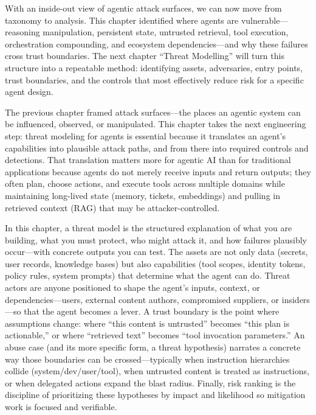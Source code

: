 \begin{TNtwocol}
  \medskip

  With an inside-out view of agentic attack surfaces, we can now move from taxonomy to analysis. This chapter identified where agents are vulnerable—reasoning manipulation, persistent state, untrusted retrieval, tool execution, orchestration compounding, and ecosystem dependencies—and why these failures cross trust boundaries. The next chapter ``Threat Modelling'' will turn this structure into a repeatable method: identifying assets, adversaries, entry points, trust boundaries, and the controls that most effectively reduce risk for a specific agent design.

\end{TNtwocol}


\begin{TNtwocol}

  The previous chapter framed attack surfaces—the places an agentic system can be influenced, observed, or manipulated. This chapter takes the next engineering step: threat modeling for agents is essential because it translates an agent's capabilities into plausible attack paths, and from there into required controls and detections. That translation matters more for agentic AI than for traditional applications because agents do not merely receive inputs and return outputs; they often plan, choose actions, and execute tools across multiple domains while maintaining long-lived state (memory, tickets, embeddings) and pulling in retrieved context (RAG) that may be attacker-controlled.

  In this chapter, a threat model is the structured explanation of what you are building, what you must protect, who might attack it, and how failures plausibly occur—with concrete outputs you can test. The assets are not only data (secrets, user records, knowledge bases) but also capabilities (tool scopes, identity tokens, policy rules, system prompts) that determine what the agent can do. Threat actors are anyone positioned to shape the agent's inputs, context, or dependencies—users, external content authors, compromised suppliers, or insiders—so that the agent becomes a lever. A trust boundary is the point where assumptions change: where “this content is untrusted” becomes “this plan is actionable,” or where “retrieved text” becomes “tool invocation parameters.” An abuse case (and its more specific form, a threat hypothesis) narrates a concrete way those boundaries can be crossed—typically when instruction hierarchies collide (system/dev/user/tool), when untrusted content is treated as instructions, or when delegated actions expand the blast radius. Finally, risk ranking is the discipline of prioritizing these hypotheses by impact and likelihood so mitigation work is focused and verifiable.


\end{TNtwocol}
